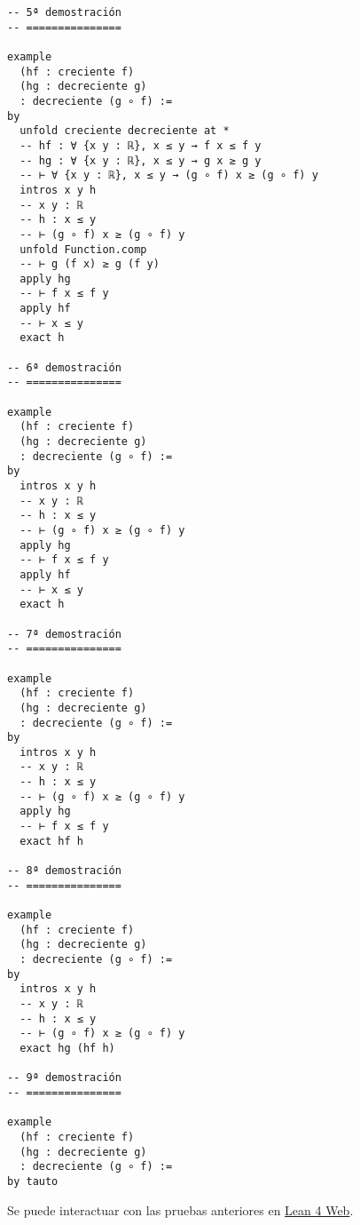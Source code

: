 \begin{verbatim}
-- 5ª demostración
-- ===============

example
  (hf : creciente f)
  (hg : decreciente g)
  : decreciente (g ∘ f) :=
by
  unfold creciente decreciente at *
  -- hf : ∀ {x y : ℝ}, x ≤ y → f x ≤ f y
  -- hg : ∀ {x y : ℝ}, x ≤ y → g x ≥ g y
  -- ⊢ ∀ {x y : ℝ}, x ≤ y → (g ∘ f) x ≥ (g ∘ f) y
  intros x y h
  -- x y : ℝ
  -- h : x ≤ y
  -- ⊢ (g ∘ f) x ≥ (g ∘ f) y
  unfold Function.comp
  -- ⊢ g (f x) ≥ g (f y)
  apply hg
  -- ⊢ f x ≤ f y
  apply hf
  -- ⊢ x ≤ y
  exact h

-- 6ª demostración
-- ===============

example
  (hf : creciente f)
  (hg : decreciente g)
  : decreciente (g ∘ f) :=
by
  intros x y h
  -- x y : ℝ
  -- h : x ≤ y
  -- ⊢ (g ∘ f) x ≥ (g ∘ f) y
  apply hg
  -- ⊢ f x ≤ f y
  apply hf
  -- ⊢ x ≤ y
  exact h

-- 7ª demostración
-- ===============

example
  (hf : creciente f)
  (hg : decreciente g)
  : decreciente (g ∘ f) :=
by
  intros x y h
  -- x y : ℝ
  -- h : x ≤ y
  -- ⊢ (g ∘ f) x ≥ (g ∘ f) y
  apply hg
  -- ⊢ f x ≤ f y
  exact hf h

-- 8ª demostración
-- ===============

example
  (hf : creciente f)
  (hg : decreciente g)
  : decreciente (g ∘ f) :=
by
  intros x y h
  -- x y : ℝ
  -- h : x ≤ y
  -- ⊢ (g ∘ f) x ≥ (g ∘ f) y
  exact hg (hf h)

-- 9ª demostración
-- ===============

example
  (hf : creciente f)
  (hg : decreciente g)
  : decreciente (g ∘ f) :=
by tauto
\end{verbatim}
Se puede interactuar con las pruebas anteriores en \href{https://lean.math.hhu.de/\#url=https://raw.githubusercontent.com/jaalonso/Calculemus2/main/src/La\_composicion\_de\_una\_funcion\_creciente\_y\_una\_decreciente\_es\_decreciente.lean}{Lean 4 Web}.

